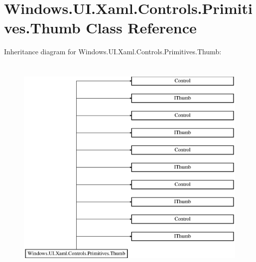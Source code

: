 \hypertarget{class_windows_1_1_u_i_1_1_xaml_1_1_controls_1_1_primitives_1_1_thumb}{}\section{Windows.\+U\+I.\+Xaml.\+Controls.\+Primitives.\+Thumb Class Reference}
\label{class_windows_1_1_u_i_1_1_xaml_1_1_controls_1_1_primitives_1_1_thumb}
Inheritance diagram for Windows.\+U\+I.\+Xaml.\+Controls.\+Primitives.\+Thumb\+:\begin{figure}[H]
\begin{center}
\leavevmode
\includegraphics[height=11.000000cm]{class_windows_1_1_u_i_1_1_xaml_1_1_controls_1_1_primitives_1_1_thumb}
\end{center}
\end{figure}
